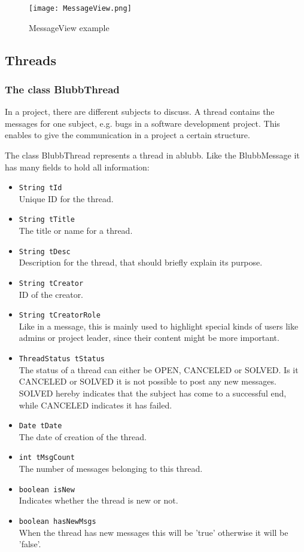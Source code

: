 \documentclass[12pt,a4paper,oneside]{report}
\newcommand{\appname}{ablubb}
\newcommand{\code}[1]{\lstinline{#1}}
\begin{document}
\begin{figure}[!ht]
	\centering
    \texttt{[image: MessageView.png]}
	\caption{MessageView example}
\end{figure}

\subsection{Threads}
\subsubsection{The class BlubbThread}
In a project, there are different subjects to discuss. A thread contains the messages for one subject, e.g. bugs in a software development project. This enables to give the communication in a project a certain structure. 

The class BlubbThread represents a thread in \appname . Like the BlubbMessage it has many fields to hold all information:
\begin{itemize}
\item \code{String tId}\\
Unique ID for the thread.
\item \code{String tTitle}\\
The title or name for a thread.
\item \code{String tDesc}\\
Description for the thread, that should briefly explain its purpose.
\item \code{String tCreator}\\
ID of the creator.
\item \code{String tCreatorRole}\\
Like in a message, this is mainly used to highlight special kinds of users like admins or project leader, since their content might be more important.
\item \code{ThreadStatus tStatus}\\
The status of a thread can either be OPEN, CANCELED or SOLVED. Is it CANCELED or SOLVED it is not possible to post any new messages. SOLVED hereby indicates that the subject has come to a successful end, while CANCELED indicates it has failed.
\item \code{Date tDate}\\
The date of creation of the thread.
\item \code{int tMsgCount}\\
The number of messages belonging to this thread.
\item \code{boolean isNew}\\
Indicates whether the thread is new or not.
\item \code{boolean hasNewMsgs}\\
When the thread has new messages this will be 'true' otherwise it will be 'false'.

\end{itemize}
\end{document}
